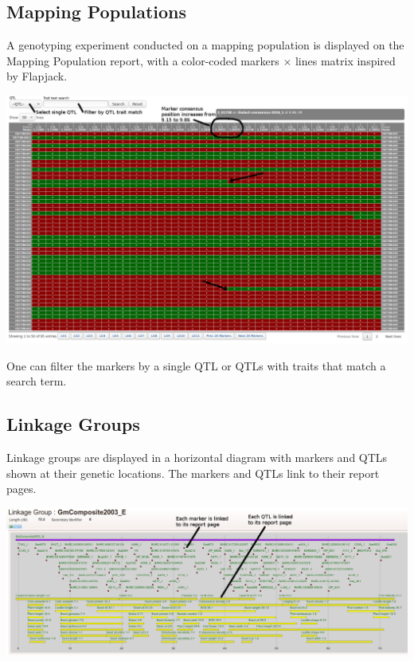 \documentclass[]{pagposter}
\newlength{\figwidth}
\begin{document}
\begin{multicols*}{3}
  \subsection*{Mapping Populations}

  A genotyping experiment conducted on a mapping population is displayed on the Mapping Population report, with a color-coded markers $\times$ lines matrix inspired by Flapjack.

  \begin{center}
    \includegraphics[width=\figwidth]{genotype-matrix.png} %
  \end{center}

  One can filter the markers by a single QTL or QTLs with traits that match a search term.

  \subsection*{Linkage Groups}

  Linkage groups are displayed in a horizontal diagram with markers and QTLs shown at their genetic locations. The markers and QTLs link to their report pages.

  \begin{center}
    \includegraphics[width=\figwidth]{linkage-group-diagram.png} %
  \end{center}
  

\end{multicols*}
\end{document}
